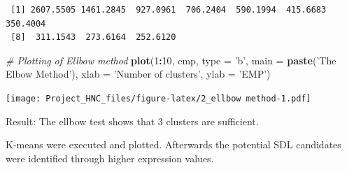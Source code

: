 \documentclass[]{article}
\newenvironment{Shaded}{\begin{snugshade}}{\end{snugshade}}
\newcommand{\KeywordTok}[1]{\textcolor[rgb]{0.13,0.29,0.53}{\textbf{#1}}}
\newcommand{\DataTypeTok}[1]{\textcolor[rgb]{0.13,0.29,0.53}{#1}}
\newcommand{\DecValTok}[1]{\textcolor[rgb]{0.00,0.00,0.81}{#1}}
\newcommand{\StringTok}[1]{\textcolor[rgb]{0.31,0.60,0.02}{#1}}
\newcommand{\CommentTok}[1]{\textcolor[rgb]{0.56,0.35,0.01}{\textit{#1}}}
\newcommand{\ControlFlowTok}[1]{\textcolor[rgb]{0.13,0.29,0.53}{\textbf{#1}}}
\newcommand{\OperatorTok}[1]{\textcolor[rgb]{0.81,0.36,0.00}{\textbf{#1}}}
\newcommand{\NormalTok}[1]{#1}
\begin{document}
\begin{Shaded}
\end{Shaded}

\begin{verbatim}
 [1] 2607.5505 1461.2845  927.0961  706.2404  590.1994  415.6683  350.4004
 [8]  311.1543  273.6164  252.6120
\end{verbatim}

\begin{Shaded}
\begin{Highlighting}[]
\CommentTok{# Plotting of Ellbow method}
\KeywordTok{plot}\NormalTok{(}\DecValTok{1}\OperatorTok{:}\DecValTok{10}\NormalTok{,}
\NormalTok{     emp,}
     \DataTypeTok{type =} \StringTok{'b'}\NormalTok{,}
     \DataTypeTok{main =} \KeywordTok{paste}\NormalTok{(}\StringTok{'The Elbow Method'}\NormalTok{),}
     \DataTypeTok{xlab =} \StringTok{'Number of clusters'}\NormalTok{,}
     \DataTypeTok{ylab =} \StringTok{'EMP'}\NormalTok{) }
\end{Highlighting}
\end{Shaded}

\texttt{[image: Project\_HNC\_files/figure-latex/2\_ellbow method-1.pdf]}

Result: The ellbow test shows that 3 clusters are sufficient.

K-means were executed and plotted. Afterwards the potential SDL
candidates were identified through higher expression values.
\end{document}
